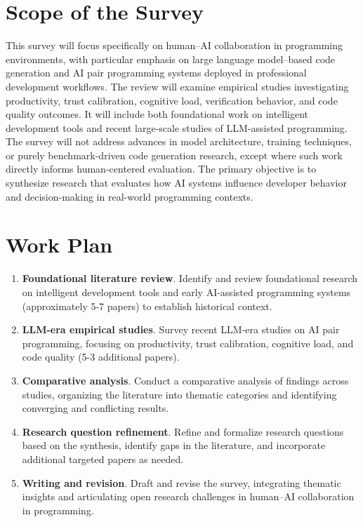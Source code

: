 \section*{Scope of the Survey}
This survey will focus specifically on human–AI collaboration in programming environments, with particular emphasis on large language model–based code generation and AI pair programming systems deployed in professional development workflows. The review will examine empirical studies investigating productivity, trust calibration, cognitive load, verification behavior, and code quality outcomes. It will include both foundational work on intelligent development tools and recent large-scale studies of LLM-assisted programming. The survey will not address advances in model architecture, training techniques, or purely benchmark-driven code generation research, except where such work directly informs human-centered evaluation. The primary objective is to synthesize research that evaluates how AI systems influence developer behavior and decision-making in real-world programming contexts.

\section*{Work Plan}
\begin{enumerate}[leftmargin=*, label=\textbf{Week \arabic*:}]
    \item \textbf{Foundational literature review}. Identify and review foundational research on intelligent development tools and early AI-assisted programming systems (approximately 5-7 papers) to establish historical context.
    \item \textbf{LLM-era empirical studies}. Survey recent LLM-era studies on AI pair programming, focusing on productivity, trust calibration, cognitive load, and code quality (5-3 additional papers).
    \item \textbf{Comparative analysis}. Conduct a comparative analysis of findings across studies, organizing the literature into thematic categories and identifying converging and conflicting results.
    \item \textbf{Research question refinement}. Refine and formalize research questions based on the synthesis, identify gaps in the literature, and incorporate additional targeted papers as needed.
    \item \textbf{Writing and revision}. Draft and revise the survey, integrating thematic insights and articulating open research challenges in human–AI collaboration in programming.
\end{enumerate}